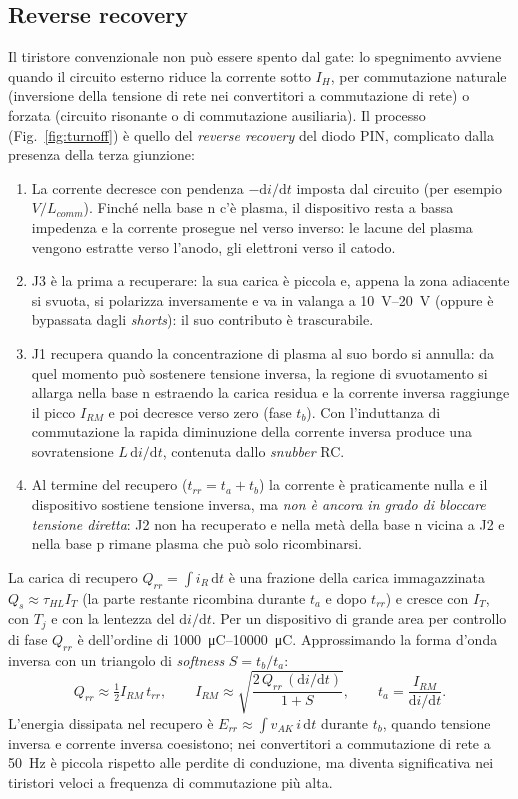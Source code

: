 \documentclass[11pt,a4paper]{article}
\newcommand{\IH}{\ensuremath{I_H}}
\newcommand{\didt}{\ensuremath{\mathrm{d}i/\mathrm{d}t}}
\newcommand{\dd}{\mathrm{d}}
\newcommand{\en}[1]{\emph{#1}}   %
\begin{document}
\subsection{Reverse recovery}
\label{sec:rr}
Il tiristore convenzionale non può essere spento dal gate: lo spegnimento avviene quando il circuito esterno riduce la corrente sotto $\IH$, per commutazione naturale (inversione della tensione di rete nei convertitori a commutazione di rete) o forzata (circuito risonante o di commutazione ausiliaria). Il processo (Fig.~\ref{fig:turnoff}) è quello del \en{reverse recovery} del diodo PIN, complicato dalla presenza della terza giunzione:
\begin{enumerate}
  \item La corrente decresce con pendenza $-\didt$ imposta dal circuito (per esempio $V/L_{comm}$). Finché nella base n c'è plasma, il dispositivo resta a bassa impedenza e la corrente prosegue nel verso inverso: le lacune del plasma vengono estratte verso l'anodo, gli elettroni verso il catodo.
  \item J3 è la prima a recuperare: la sua carica è piccola e, appena la zona adiacente si svuota, si polarizza inversamente e va in valanga a \qtyrange{10}{20}{\V} (oppure è bypassata dagli \en{shorts}): il suo contributo è trascurabile.
  \item J1 recupera quando la concentrazione di plasma al suo bordo si annulla: da quel momento può sostenere tensione inversa, la regione di svuotamento si allarga nella base n estraendo la carica residua e la corrente inversa raggiunge il picco $I_{RM}$ e poi decresce verso zero (fase $t_b$). Con l'induttanza di commutazione la rapida diminuzione della corrente inversa produce una sovratensione $L\,\didt$, contenuta dallo \en{snubber} RC.
  \item Al termine del recupero ($t_{rr}=t_a+t_b$) la corrente è praticamente nulla e il dispositivo sostiene tensione inversa, ma \emph{non è ancora in grado di bloccare tensione diretta}: J2 non ha recuperato e nella metà della base n vicina a J2 e nella base p rimane plasma che può solo ricombinarsi.
\end{enumerate}
La carica di recupero $Q_{rr}=\int i_R\,\dd t$ è una frazione della carica immagazzinata $Q_s\approx\tau_{HL}I_T$ (la parte restante ricombina durante $t_a$ e dopo $t_{rr}$) e cresce con $I_T$, con $T_j$ e con la lentezza del $\didt$. Per un dispositivo di grande area per controllo di fase $Q_{rr}$ è dell'ordine di \qtyrange{1000}{10000}{\micro\coulomb}. Approssimando la forma d'onda inversa con un triangolo di \en{softness} $S=t_b/t_a$:
\begin{equation}
  Q_{rr} \approx \tfrac12 I_{RM}\,t_{rr}, \qquad
  I_{RM} \approx \sqrt{\frac{2\,Q_{rr}\,(\didt)}{1+S}}, \qquad
  t_a = \frac{I_{RM}}{\didt}.
\end{equation}
L'energia dissipata nel recupero è $E_{rr}\approx\int v_{AK}\,i\,\dd t$ durante $t_b$, quando tensione inversa e corrente inversa coesistono; nei convertitori a commutazione di rete a \qty{50}{\Hz} è piccola rispetto alle perdite di conduzione, ma diventa significativa nei tiristori veloci a frequenza di commutazione più alta.
\end{document}
